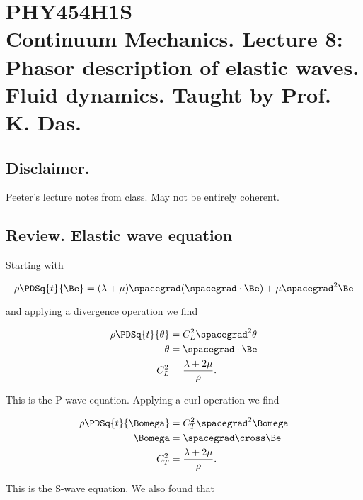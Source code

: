
%

\chapter{PHY454H1S\\Continuum Mechanics.  Lecture 8: Phasor description of elastic waves.  Fluid dynamics.  Taught by Prof. K. Das.}
\label{chap:continuumL8}
{}
\date{Feb 3, 2012}

\beginArtWithToc

\section{Disclaimer.}

Peeter's lecture notes from class.  May not be entirely coherent.

\section{Review.  Elastic wave equation}

Starting with

\begin{equation}\label{eqn:continuumL8:10}
\rho \PDSq{t}{\Be} = (\lambda + \mu) \spacegrad (\spacegrad \cdot \Be) + \mu \spacegrad^2 \Be
\end{equation}

and applying a divergence operation we find

\begin{align}\label{eqn:continuumL8:30}
\rho \PDSq{t}{\theta} &= C_L^2 \spacegrad^2 \theta \\
\theta &= \spacegrad \cdot \Be \\
C_L^2 &= \frac{\lambda + 2\mu}{\rho}.
\end{align}

This is the P-wave equation.  Applying a curl operation we find

\begin{align}\label{eqn:continuumL8:50}
\rho \PDSq{t}{\Bomega} &= C_T^2 \spacegrad^2 \Bomega \\
\Bomega &= \spacegrad \cross \Be \\
C_T^2 &= \frac{\lambda + 2\mu}{\rho}.
\end{align}

This is the S-wave equation.  We also found that

